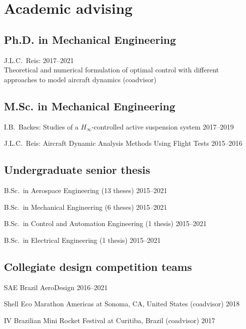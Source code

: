 \documentclass[letterpaper, 11pt, oneside]{memoir}
\begin{document}
\section{Academic advising}
\subsection{Ph.D. in Mechanical Engineering}
\begin{description}
\item {\textnormal{J.L.C.~Reis}}:
\hfill 2017--2021\\
Theoretical and numerical formulation of optimal control with different
approaches to model aircraft dynamics (coadvisor)
\end{description}

\subsection{M.Sc. in Mechanical Engineering}
\begin{description}
\item {\textnormal{I.B.~Backes}}:
  {Studies of a $H_\infty$-controlled active suspension system}{}{}{}
  \hfill {2017--2019}

\item {\textnormal{J.L.C.~Reis}}:
  {Aircraft Dynamic Analysis Methods Using Flight Tests}{}{}{}
  \hfill {2015--2016}
\end{description}

\subsection{Undergraduate senior thesis}
\begin{description}
\item
  B.Sc.~in Aerospace Engineering (13 theses) \hfill {2015--2021}
\item
  B.Sc.~in Mechanical Engineering (6 theses) \hfill {2015--2021}
\item
  B.Sc.~in Control and Automation Engineering (1 thesis) \hfill {2015--2021} 
\item
  B.Sc.~in Electrical Engineering (1 thesis) \hfill {2015--2021} 
\end{description}

\subsection{Collegiate design competition teams}
\begin{description}
\item {SAE Brazil AeroDesign} \hfill 2016--2021
\item
{Shell Eco Marathon Americas at Sonoma, CA, United States (coadvisor)}
\hfill {2018}%
\item {IV Brazilian Mini Rocket Festival at Curitiba, Brazil (coadvisor)}
  \hfill {2017}
\end{description}
\end{document}
